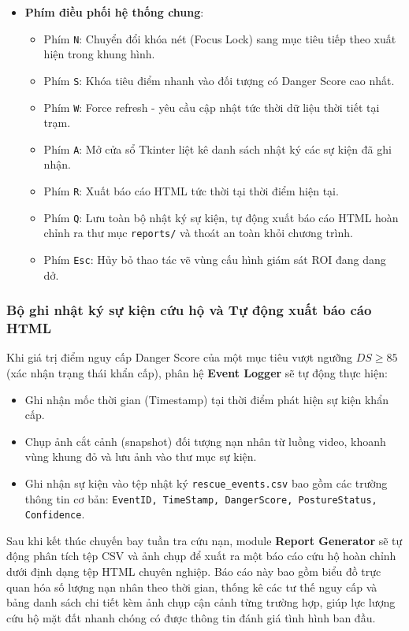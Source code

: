\begin{itemize}
\begin{itemize}
        \item Phím \texttt{B}: Bật hoặc tắt thước ngắm chữ thập trung tâm (Crosshair) để hỗ trợ điều khiển camera bám đuổi.
    \end{itemize}
    \item \textbf{Phím điều phối hệ thống chung}:
    \begin{itemize}
        \item Phím \texttt{N}: Chuyển đổi khóa nét (Focus Lock) sang mục tiêu tiếp theo xuất hiện trong khung hình.
        \item Phím \texttt{S}: Khóa tiêu điểm nhanh vào đối tượng có Danger Score cao nhất.
        \item Phím \texttt{W}: Force refresh - yêu cầu cập nhật tức thời dữ liệu thời tiết tại trạm.
        \item Phím \texttt{A}: Mở cửa sổ Tkinter liệt kê danh sách nhật ký các sự kiện đã ghi nhận.
        \item Phím \texttt{R}: Xuất báo cáo HTML tức thời tại thời điểm hiện tại.
        \item Phím \texttt{Q}: Lưu toàn bộ nhật ký sự kiện, tự động xuất báo cáo HTML hoàn chỉnh ra thư mục \texttt{reports/} và thoát an toàn khỏi chương trình.
        \item Phím \texttt{Esc}: Hủy bỏ thao tác vẽ vùng cấu hình giám sát ROI đang dang dở.
    \end{itemize}
\end{itemize}

\subsubsection{Bộ ghi nhật ký sự kiện cứu hộ và Tự động xuất báo cáo HTML}

Khi giá trị điểm nguy cấp Danger Score của một mục tiêu vượt ngưỡng $DS \ge 85$ (xác nhận trạng thái khẩn cấp), phân hệ \textbf{Event Logger} sẽ tự động thực hiện:
\begin{itemize}
    \item Ghi nhận mốc thời gian (Timestamp) tại thời điểm phát hiện sự kiện khẩn cấp.
    \item Chụp ảnh cắt cảnh (snapshot) đối tượng nạn nhân từ luồng video, khoanh vùng khung đỏ và lưu ảnh vào thư mục sự kiện.
    \item Ghi nhận sự kiện vào tệp nhật ký \texttt{rescue\_events.csv} bao gồm các trường thông tin cơ bản: \texttt{EventID, TimeStamp, DangerScore, PostureStatus, Confidence}.
\end{itemize}

Sau khi kết thúc chuyến bay tuần tra cứu nạn, module \textbf{Report Generator} sẽ tự động phân tích tệp CSV và ảnh chụp để xuất ra một báo cáo cứu hộ hoàn chỉnh dưới định dạng tệp HTML chuyên nghiệp. Báo cáo này bao gồm biểu đồ trực quan hóa số lượng nạn nhân theo thời gian, thống kê các tư thế nguy cấp và bảng danh sách chi tiết kèm ảnh chụp cận cảnh từng trường hợp, giúp lực lượng cứu hộ mặt đất nhanh chóng có được thông tin đánh giá tình hình ban đầu.


